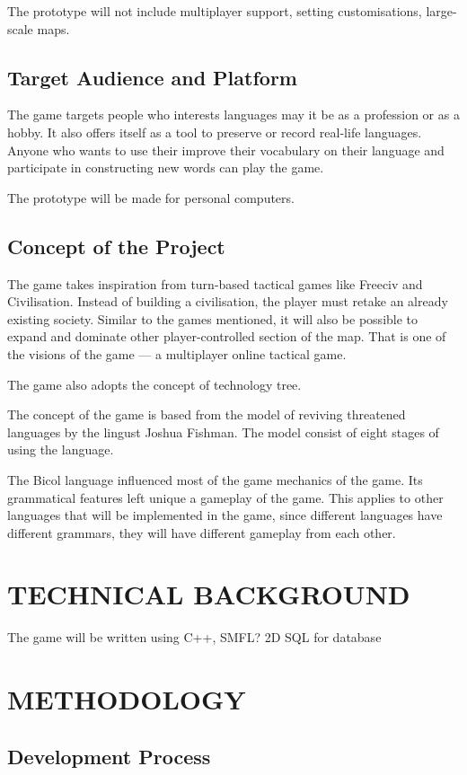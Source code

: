 \documentclass[11pt]{article}
\begin{document}
The prototype will not include multiplayer support, setting customisations, large-scale maps.



\subsection{Target Audience and Platform}
The game targets people who interests languages may it be as a profession or as a hobby. It also offers itself as a tool to preserve or record real-life languages. Anyone who wants to use their improve their vocabulary on their language and participate in constructing new words can play the game.

The prototype will be made for personal computers.

\subsection{Concept of the Project}
The game takes inspiration from turn-based tactical games like Freeciv and Civilisation. Instead of building a civilisation, the player must retake an already existing society. Similar to the games mentioned, it will also be possible to expand and dominate other player-controlled section of the map. That is one of the visions of the game --- a multiplayer online tactical game.

The game also adopts the concept of technology tree. 

The concept of the game is based from the model of reviving threatened languages by the lingust Joshua Fishman. The model consist of eight stages of using the language.

The Bicol language influenced most of the game mechanics of the game. Its grammatical features left unique a gameplay of the game. This applies to other languages that will be implemented in the game, since different languages have different grammars, they will have different gameplay from each other.

\section{TECHNICAL BACKGROUND}
The game will be written using C++, SMFL? 2D
SQL for database

\section{METHODOLOGY}
\subsection{Development Process}
\end{document}
